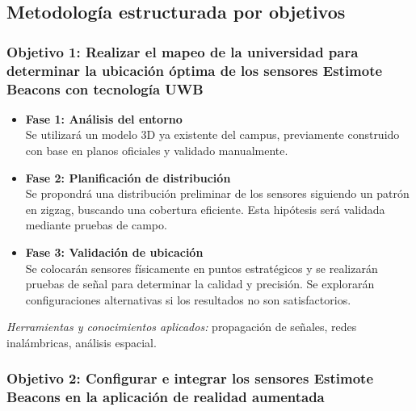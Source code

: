 \documentclass{article}
\begin{document}
\subsection{Metodología estructurada por objetivos}

\subsubsection{Objetivo 1: Realizar el mapeo de la universidad para determinar la ubicación óptima de los sensores Estimote Beacons con tecnología UWB}

\begin{itemize}
    \item \textbf{Fase 1: Análisis del entorno} \\
    Se utilizará un modelo 3D ya existente del campus, previamente construido con base en planos oficiales y validado manualmente.

    \item \textbf{Fase 2: Planificación de distribución} \\
    Se propondrá una distribución preliminar de los sensores siguiendo un patrón en zigzag, buscando una cobertura eficiente. Esta hipótesis será validada mediante pruebas de campo.

    \item \textbf{Fase 3: Validación de ubicación} \\
    Se colocarán sensores físicamente en puntos estratégicos y se realizarán pruebas de señal para determinar la calidad y precisión. Se explorarán configuraciones alternativas si los resultados no son satisfactorios.
\end{itemize}

\textit{Herramientas y conocimientos aplicados:} propagación de señales, redes inalámbricas, análisis espacial.

\subsubsection{Objetivo 2: Configurar e integrar los sensores Estimote Beacons en la aplicación de realidad aumentada}
\end{document}

